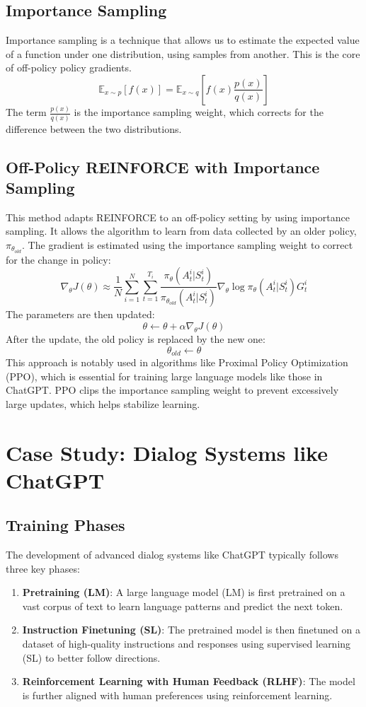 \documentclass[12pt]{article}
\begin{document}
\subsection{Importance Sampling}
Importance sampling is a technique that allows us to estimate the expected value of a function under one distribution, using samples from another. This is the core of off-policy policy gradients.
$$ \mathbb{E}_{x \sim p}[f(x)] = \mathbb{E}_{x \sim q} \left[ f(x) \frac{p(x)}{q(x)} \right] $$
The term $\frac{p(x)}{q(x)}$ is the importance sampling weight, which corrects for the difference between the two distributions.

\subsection{Off-Policy REINFORCE with Importance Sampling}
This method adapts REINFORCE to an off-policy setting by using importance sampling. It allows the algorithm to learn from data collected by an older policy, $\pi_{\theta_{old}}$.
The gradient is estimated using the importance sampling weight to correct for the change in policy:
$$ \nabla_\theta J(\theta) \approx \frac{1}{N} \sum_{i=1}^N \sum_{t=1}^{T_i} \frac{\pi_\theta(A_t^i | S_t^i)}{\pi_{\theta_{old}}(A_t^i | S_t^i)} \nabla_\theta \log \pi_\theta(A_t^i | S_t^i) G_t^i $$
The parameters are then updated:
$$ \theta \leftarrow \theta + \alpha \nabla_\theta J(\theta) $$
After the update, the old policy is replaced by the new one:
$$ \theta_{old} \leftarrow \theta $$
This approach is notably used in algorithms like Proximal Policy Optimization (PPO), which is essential for training large language models like those in ChatGPT. PPO clips the importance sampling weight to prevent excessively large updates, which helps stabilize learning.

\section{Case Study: Dialog Systems like ChatGPT }

\subsection{Training Phases}
The development of advanced dialog systems like ChatGPT typically follows three key phases:
\begin{enumerate}
    \item \textbf{Pretraining (LM)}: A large language model (LM) is first pretrained on a vast corpus of text to learn language patterns and predict the next token.
    \item \textbf{Instruction Finetuning (SL)}: The pretrained model is then finetuned on a dataset of high-quality instructions and responses using supervised learning (SL) to better follow directions.
    \item \textbf{Reinforcement Learning with Human Feedback (RLHF)}: The model is further aligned with human preferences using reinforcement learning.
\end{enumerate}
\end{document}
